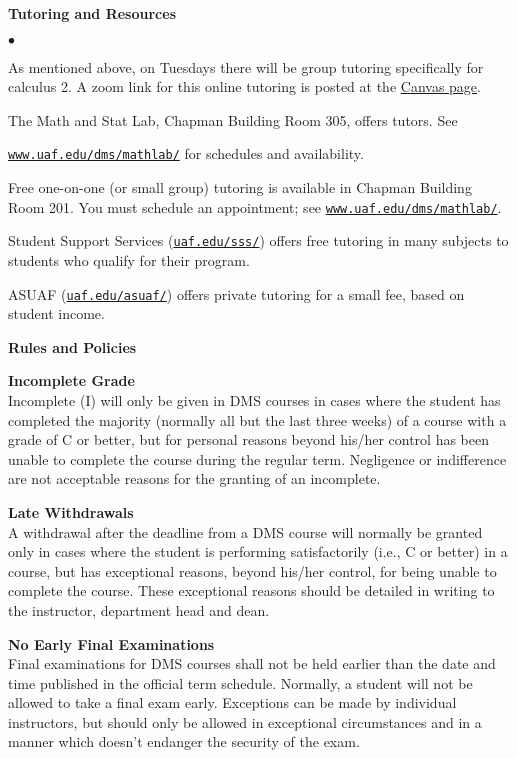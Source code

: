 \documentclass[12pt]{article}
\renewcommand{\emph}[1]{\textsf{\textbf{#1}}}
\newcommand{\localhead}[1]{\par\smallskip\textbf{#1} \smallskip\nobreak\\}%
\def\heading#1{\localhead{\large\emph{#1}}}
\def\subheading#1{\localhead{\emph{#1}}}
\newenvironment{clist}%
{\bgroup\parskip 0pt\begin{list}{$\bullet$}{\partopsep 4pt\topsep 0pt\itemsep -2pt}}%
{\end{list}\egroup}%
\begin{document}
\heading{Tutoring and Resources}
\vskip -30pt\strut
\begin{clist}
    \item As mentioned above, on Tuesdays there will be group tutoring specifically for calculus 2.  A zoom link for this online tutoring is posted at the \href{https://canvas.alaska.edu/courses/9933}{Canvas page}.
	\item The Math and Stat Lab, Chapman Building Room 305, offers tutors. 
	See 

	\href{http://www.uaf.edu/dms/mathlab/}{\texttt{www.uaf.edu/dms/mathlab/}} for schedules and availability.
	\item Free
one-on-one (or small group) tutoring is available in 
Chapman Building Room 201. You must schedule an
appointment; see \href{http://www.uaf.edu/dms/mathlab/}{\texttt{www.uaf.edu/dms/mathlab/}}.
	\item Student Support Services (\href{https://uaf.edu/sss/}{\texttt{uaf.edu/sss/}}) offers free tutoring in many subjects to students who qualify for their program.
	\item ASUAF (\href{https://uaf.edu/asuaf/}{\texttt{uaf.edu/asuaf/}}) offers private tutoring for a small fee, based on student income.
\end{clist}

\heading{Rules and Policies}
\vskip -20pt

\subheading{Incomplete Grade} 
Incomplete (I) will only be given in
  DMS courses in cases where
  the student has completed the majority (normally all but the last
  three weeks) of a course with a grade of C or better, but for
  personal reasons beyond his/her control has been unable to complete
  the course during the regular term. Negligence or indifference are
  not acceptable reasons for the granting of an incomplete. 

\subheading{Late Withdrawals} 
A withdrawal after the deadline from a DMS course will
  normally be granted only in cases where the student is performing
  satisfactorily (i.e., C or better) in a course, but has exceptional
  reasons, beyond his/her control, for being unable to complete the
  course. These exceptional reasons should be detailed in writing to
  the instructor, department head and dean.

\subheading{No Early Final Examinations}
Final examinations for DMS
  courses shall not be held earlier than the date and time published
  in the official term schedule. Normally, a student will not be
  allowed to take a final exam early. Exceptions can be made by
  individual instructors, but should only be allowed in exceptional
  circumstances and in a manner which doesn't endanger the security of
  the exam.
\end{document}
